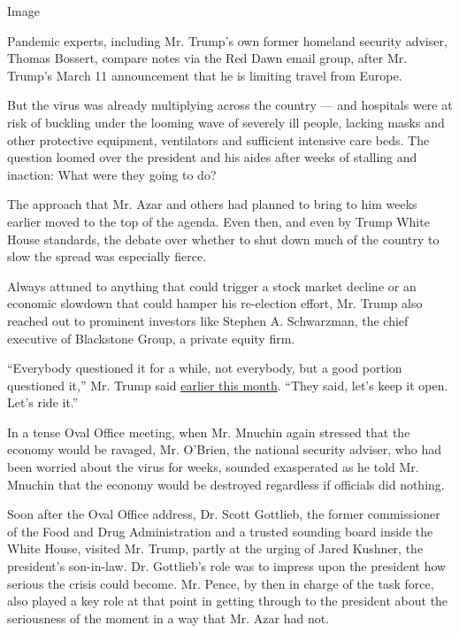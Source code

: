 Image

Pandemic experts, including Mr. Trump's own former homeland security
adviser, Thomas Bossert, compare notes via the Red Dawn email group,
after Mr. Trump's March 11 announcement that he is limiting travel from
Europe.

But the virus was already multiplying across the country --- and
hospitals were at risk of buckling under the looming wave of severely
ill people, lacking masks and other protective equipment, ventilators
and sufficient intensive care beds. The question loomed over the
president and his aides after weeks of stalling and inaction: What were
they going to do?

The approach that Mr. Azar and others had planned to bring to him weeks
earlier moved to the top of the agenda. Even then, and even by Trump
White House standards, the debate over whether to shut down much of the
country to slow the spread was especially fierce.

Always attuned to anything that could trigger a stock market decline or
an economic slowdown that could hamper his re-election effort, Mr. Trump
also reached out to prominent investors like Stephen A. Schwarzman, the
chief executive of Blackstone Group, a private equity firm.

``Everybody questioned it for a while, not everybody, but a good portion
questioned it,'' Mr. Trump said
\href{https://www.whitehouse.gov/briefings-statements/remarks-president-trump-vice-president-pence-members-coronavirus-task-force-press-briefing-17/}{earlier
this month}. ``They said, let's keep it open. Let's ride it.''

In a tense Oval Office meeting, when Mr. Mnuchin again stressed that the
economy would be ravaged, Mr. O'Brien, the national security adviser,
who had been worried about the virus for weeks, sounded exasperated as
he told Mr. Mnuchin that the economy would be destroyed regardless if
officials did nothing.

Soon after the Oval Office address, Dr. Scott Gottlieb, the former
commissioner of the Food and Drug Administration and a trusted sounding
board inside the White House, visited Mr. Trump, partly at the urging of
Jared Kushner, the president's son-in-law. Dr. Gottlieb's role was to
impress upon the president how serious the crisis could become. Mr.
Pence, by then in charge of the task force, also played a key role at
that point in getting through to the president about the seriousness of
the moment in a way that Mr. Azar had not.

